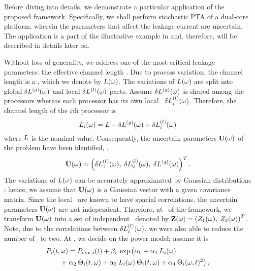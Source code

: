 Before diving into details, we demonstrate a particular application of the proposed framework. Specifically, we shall perform stochastic PTA of a dual-core platform, wherein the parameters that affect the leakage current are uncertain. The application is a part of the illustrative example in  and, therefore, will be described in details later on.



Without loss of generality, we address one of the most critical leakage parameters: the effective channel length \cite{chandra2010, juan2011, juan2012, srivastava2010, shen2009}. Due to process variation, the channel length is a \rv, which we denote by $L(\omega)$. The variations of $L(\omega)$ are split into global ${\delta L^{(g)}}(\omega)$ and local $\delta L^{(l)}(\omega)$ parts. Assume ${\delta L^{(g)}}(\omega)$ is shared among the processors whereas each processor has its own local \rv\ $\delta L^{(l)}_i(\omega)$. Therefore, the channel length of the $i$th processor is
\begin{equation} \elabel{leakage-partition}
  \Leff_i(\o) = \nLeff + \gLeff(\o) + \lLeff_i(\o)
\end{equation}
where $L$ is the nominal value. Consequently, the uncertain parameters $\mathbf{U}(\omega)$ of the problem have been identified, \ie,
\[
  \mathbf{U}(\omega) = \left(\delta L^{(l)}_1(\omega), \; \delta L^{(l)}_2(\omega), \; {\delta L^{(g)}}(\omega) \right)^T.
\]
The variations of $L(\omega)$ can be accurately approximated by Gaussian distributions \cite{juan2011, juan2012, srivastava2010}; hence, we assume that $\mathbf{U}(\omega)$ is a Gaussian vector with a given covariance matrix. Since the local \rvs\ are known to have spacial correlations, the uncertain parameters $\mathbf{U}(\omega)$ are not independent. Therefore, at \ of the framework, we transform $\mathbf{U}(\omega)$ into a set of independent \rvs\ denoted by $\mathbf{Z}(\omega) = \left(Z_1(\omega), \; Z_2(\omega)\right)^T$. Note, due to the correlations between $\delta L^{(l)}_i(\omega)$, we were also able to reduce the number of \rvs\ to two. At , we decide on the power model; assume it is
\begin{align*}
  & \P_i(\t, \o) = \P_{\dyn, i}(\t) + \beta_i \: \exp \left(\vphantom{\T^2_i} \alpha_0 + \alpha_1 \: \Leff_i(\o) \right. \\
  & \qquad {} + \left. \alpha_2 \: \T_i(\t, \o) + \alpha_3 \: \Leff_i(\o) \: \T_i(\t, \o) + \alpha_4 \: \T_i(\o, \t)^2 \right),
\end{align*}
